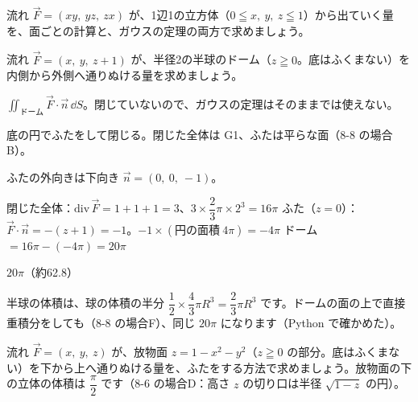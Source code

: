 \begin{jibun}
流れ $\vec F=(xy,\ yz,\ zx)$ が、1辺1の立方体（$0\leqq x,\ y,\ z\leqq1$）から出ていく量を、面ごとの計算と、ガウスの定理の両方で求めましょう。
\end{jibun}

\begin{reidai}
流れ $\vec F=(x,\ y,\ z+1)$ が、半径2の半球のドーム（$z\geqq0$。底はふくまない）を内側から外側へ通りぬける量を求めましょう。\par
\kangaekata {}\par
{}\enspace $\iint_{\text{ドーム}}\vec F\cdot\vec n\,\dd S$。閉じていないので、ガウスの定理はそのままでは使えない。\par
{}\enspace 底の円でふたをして閉じる。閉じた全体は G1、ふたは平らな面（8-8 の場合B）。\par
{}\enspace ふたの外向きは下向き $\vec n=(0,\ 0,\ -1)$。\par
\shiki 閉じた全体：$\mathrm{div}\,\vec F=1+1+1=3$、$3\times\dfrac{2}{3}\pi\times2^3=16\pi$\kviiilq
ふた（$z=0$）：$\vec F\cdot\vec n=-(z+1)=-1$。$-1\times(\text{円の面積}\ 4\pi)=-4\pi$\kviiilq
ドーム $=16\pi-(-4\pi)=20\pi$\par
\kotae $20\pi$（約62.8）
\end{reidai}
\noindent 半球の体積は、球の体積の半分 $\dfrac{1}{2}\times\dfrac{4}{3}\pi R^3=\dfrac{2}{3}\pi R^3$ です。ドームの面の上で直接重積分をしても（8-8 の場合F）、同じ $20\pi$ になります（Python で確かめた）。

\begin{jibun}
流れ $\vec F=(x,\ y,\ z)$ が、放物面 $z=1-x^2-y^2$（$z\geqq0$ の部分。底はふくまない）を下から上へ通りぬける量を、ふたをする方法で求めましょう。放物面の下の立体の体積は $\dfrac{\pi}{2}$ です（8-6 の場合D：高さ $z$ の切り口は半径 $\sqrt{1-z}$ の円）。
\end{jibun}

